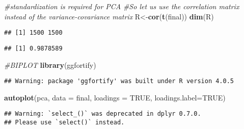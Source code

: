 \documentclass[
]{article}
\newenvironment{Shaded}{\begin{snugshade}}{\end{snugshade}}
\newcommand{\CommentTok}[1]{\textcolor[rgb]{0.56,0.35,0.01}{\textit{#1}}}
\newcommand{\DataTypeTok}[1]{\textcolor[rgb]{0.13,0.29,0.53}{#1}}
\newcommand{\DecValTok}[1]{\textcolor[rgb]{0.00,0.00,0.81}{#1}}
\newcommand{\KeywordTok}[1]{\textcolor[rgb]{0.13,0.29,0.53}{\textbf{#1}}}
\newcommand{\NormalTok}[1]{#1}
\newcommand{\OperatorTok}[1]{\textcolor[rgb]{0.81,0.36,0.00}{\textbf{#1}}}
\newcommand{\OtherTok}[1]{\textcolor[rgb]{0.56,0.35,0.01}{#1}}
\begin{document}
\begin{Shaded}
\begin{Highlighting}[]
\CommentTok{#standardization is required for PCA}
\CommentTok{#So let us use the correlation matrix instead of the variance-covariance matrix}
\NormalTok{R<-}\KeywordTok{cor}\NormalTok{(}\KeywordTok{t}\NormalTok{(final))}
\KeywordTok{dim}\NormalTok{(R)}
\end{Highlighting}
\end{Shaded}

\begin{verbatim}
## [1] 1500 1500
\end{verbatim}

\begin{Shaded}
\end{Shaded}

\begin{verbatim}
## [1] 0.9878589
\end{verbatim}

\begin{Shaded}
\begin{Highlighting}[]
\CommentTok{#BIPLOT}
\KeywordTok{library}\NormalTok{(ggfortify)}
\end{Highlighting}
\end{Shaded}

\begin{verbatim}
## Warning: package 'ggfortify' was built under R version 4.0.5
\end{verbatim}

\begin{Shaded}
\begin{Highlighting}[]
\KeywordTok{autoplot}\NormalTok{(pca, }\DataTypeTok{data =}\NormalTok{ final, }\DataTypeTok{loadings =} \OtherTok{TRUE}\NormalTok{, }\DataTypeTok{loadings.label=}\OtherTok{TRUE}\NormalTok{)}
\end{Highlighting}
\end{Shaded}

\begin{verbatim}
## Warning: `select_()` was deprecated in dplyr 0.7.0.
## Please use `select()` instead.
\end{verbatim}
\end{document}
